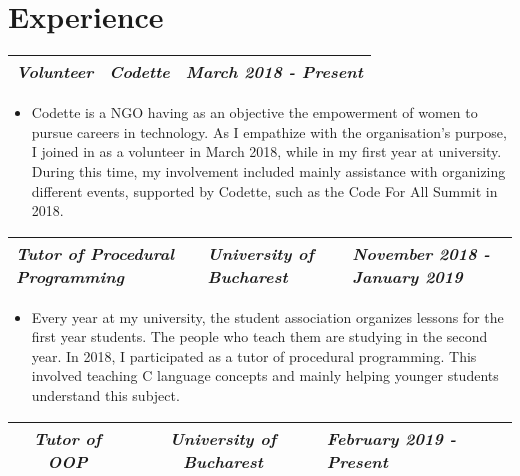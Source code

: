 \documentclass{article}
\begin{document}
    
    \section*{ Experience }
        \setlength{\tabcolsep}{65pt}
        \begin{tabular} {ccL{3cm}}
            \footnotesize\textit{\textbf{Volunteer}} 
            & \footnotesize\textit{\textbf{Codette}} 
            & \footnotesize\textit{\textbf{March 2018 - Present}}\\
            \hline
        \end{tabular}

        \begin{itemize}
            \item \footnotesize Codette is a NGO having as an objective the empowerment of women to pursue careers in technology. As I empathize with the organisation's purpose, I joined in as a volunteer in March 2018, while in my first year at university. During this time, my involvement included mainly assistance with organizing different events, supported by Codette, such as the Code For All Summit in 2018.
        \end{itemize}

        \setlength{\tabcolsep}{20pt}
        \begin{tabular} {C{5cm}L{5cm}C{3cm}}
            \footnotesize\textit{\textbf{Tutor of Procedural Programming}} 
            & \footnotesize\textit{\textbf{University of Bucharest}} 
            & \footnotesize\textit{\textbf{November 2018 - January 2019}}\\
            \hline
        \end{tabular}

        \begin{itemize}
            \item \footnotesize Every year at my university, the student association organizes lessons for the first year students. The people who teach them are studying in the second year. In 2018, I participated as a tutor of procedural programming. This involved teaching C language concepts and mainly helping younger students understand this subject.
        \end{itemize}

        \setlength{\tabcolsep}{45pt}
        \begin{tabular} {ccC{3cm}}
            \footnotesize\textit{\textbf{Tutor of OOP}} 
            & \footnotesize\textit{\textbf{University of Bucharest}} 
            & \footnotesize\textit{\textbf{February 2019 - Present}}\\
            \hline
        \end{tabular}
\end{document}
